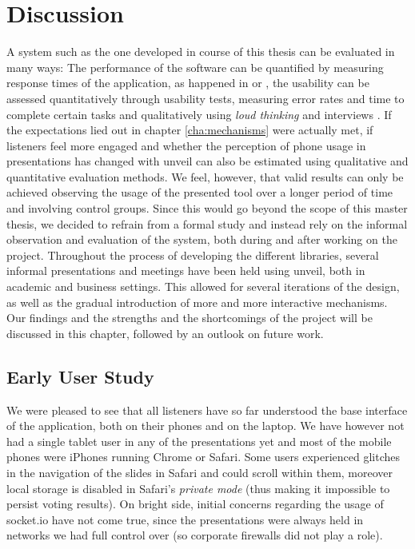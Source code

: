 \chapter{Discussion}
\label{cha:discussion}

A system such as the one developed in course of this thesis can be evaluated in many ways: The performance of the software can be quantified by measuring response times of the application, as happened in \cite{Niwa:Web-presentation-powerpoint} or \cite{Inoue:RealTimeQuestionnaire}, the usability can be assessed quantitatively through usability tests, measuring error rates and time to complete certain tasks and qualitatively using \emph{loud thinking} and interviews \cite{Reindl:automatisierte-user-interface-evaluierung}. If the expectations lied out in chapter \ref{cha:mechanisms} were actually met, if listeners feel more engaged and whether the perception of phone usage in presentations has changed with unveil can also be estimated using qualitative and quantitative evaluation methods. We feel, however, that valid results can only be achieved observing the usage of the presented tool over a longer period of time and involving control groups. Since this would go beyond the scope of this master thesis, we decided to refrain from a formal study and instead rely on the informal observation and evaluation of the system, both during and after working on the project.
Throughout the process of developing the different libraries, several informal presentations and meetings have been held using unveil, both in academic and business settings. This allowed for several iterations of the design, as well as the gradual introduction of more and more interactive mechanisms. Our findings and the strengths and the shortcomings of the project will be discussed in this chapter, followed by an outlook on future work.

\section{Early User Study}
\label{sec:discussion-usability}

We were pleased to see that all listeners have so far understood the base interface of the application, both on their phones and on the laptop. We have however not had a single tablet user in any of the presentations yet and most of the mobile phones were iPhones running Chrome or Safari. Some users experienced glitches in the navigation of the slides in Safari and could scroll within them, moreover local storage is disabled in Safari's \emph{private mode} (thus making it impossible to persist voting results). On bright side, initial concerns regarding the usage of socket.io have not come true, since the presentations were always held in networks we had full control over (so corporate firewalls did not play a role).

